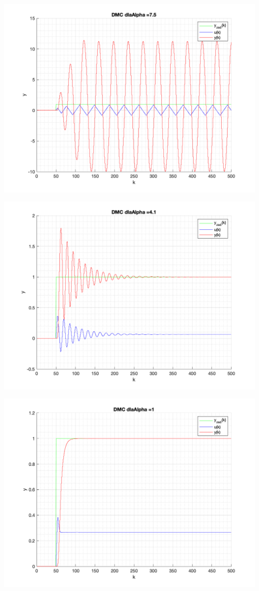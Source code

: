 \documentclass[a4paper, 11pt]{article}
\begin{document}
\begin{enumerate}
 \includegraphics[width=\linewidth]{./ModelsDodatkowe_Alpha/P4_DMC_Alpha_7_5_png.png} 
 
 \includegraphics[width=\linewidth]{./ModelsDodatkowe_Alpha/P4_DMC_Alpha_4_1_png.png} 
 
 \includegraphics[width=\linewidth]{./ModelsDodatkowe_Alpha/P4_DMC_Alpha_1_png.png} 
 

\end{enumerate}
\end{document}
